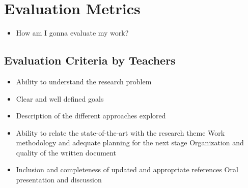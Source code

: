 
\section{Evaluation Metrics} %
\label{sec:evaluation_metrics}


\begin{itemize}
  \item How am I gonna evaluate my work?
\end{itemize}

\subsection{Evaluation Criteria by Teachers} %
\label{sub:evaluation_criteria}
\begin{itemize}
  \item Ability to understand the research problem
  \item Clear and well defined goals
  \item Description of the different approaches explored
  \item Ability to relate the state-of-the-art with the research theme Work methodology and adequate planning for the next stage Organization and quality of the written document
  \item Inclusion and completeness of updated and appropriate references Oral presentation and discussion
\end{itemize}
